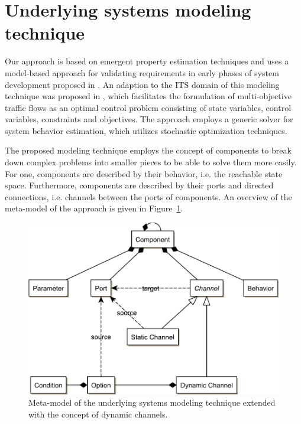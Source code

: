 \section{Underlying systems modeling technique}
\label{section:foundation}

Our approach is based on emergent property estimation techniques \cite{hackenberg2012towards} and uses a model-based approach for validating requirements in early phases of system development proposed in \cite{hackenberg2014rapid}. An adaption to the ITS domain of this modeling technique was proposed in \cite{ascher2014early}, which facilitates the formulation of multi-objective traffic flows as an optimal control problem consisting of state variables, control variables, constraints and objectives. The approach employs a generic solver for system behavior estimation, which utilizes stochastic optimization techniques.

The proposed modeling technique employs the concept of components to break down complex problems into smaller pieces to be able to solve them more easily. For one, components are described by their behavior, i.e. the reachable state space. Furthermore, components are described by their ports and directed connections, i.e. channels between the ports of components. An overview of the meta-model of the approach is given in Figure~\ref{fig:meta_model}.

\begin{figure}[h]
	\centering
	\includegraphics[width=\columnwidth]{../gfx/meta_model.pdf}
	\caption{Meta-model of the underlying systems modeling technique extended with the concept of dynamic channels.}
	\label{fig:meta_model}
\end{figure}


